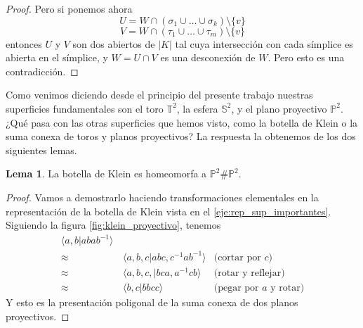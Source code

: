 \documentclass[10pt]{report}
\newcommand{\Esfera}{\mathbb{S}^2}
\newcommand{\Toro}{\mathbb{T}^2}
\newcommand{\Proyectivo}{\mathbb{P}^2}
\theoremstyle{definition}
\newtheorem{lema}[defin]{Lema}
\begin{document}
\begin{proof}
Pero si ponemos ahora $$U=W\cap (\sigma_1 \cup \dots \cup \sigma_k )\setminus \{ v \}$$
$$V=W\cap (\tau_1 \cup \dots \cup \tau_m )\setminus \{ v \}$$ entonces $U$ y $V$ son dos abiertos de $|K|$ tal cuya intersección con cada símplice es abierta en el símplice, y $W=U\cap V$ es una desconexión de $W$. Pero esto es una contradicción.
\end{proof}

Como venimos diciendo desde el principio del presente trabajo nuestras superficies fundamentales son el toro $\Toro$, la esfera $ \Esfera$, y el plano proyectivo  $\Proyectivo$. ¿Qué pasa con las otras superficies que hemos visto, como la botella de Klein o la suma conexa de toros y planos proyectivos? La respuesta la obtenemos de los dos siguientes lemas.

\begin{lema}
La botella de Klein es homeomorfa a $\Proyectivo \# \Proyectivo$.
\end{lema}
\begin{proof}
Vamos a demostrarlo haciendo transformaciones elementales en la representación de la botella de Klein vista en el \autoref{eje:rep_sup_importantes}. 
Siguiendo la figura \autoref{fig:klein_proyectivo}, tenemos
\begin{align*}
\langle a,b| abab^{-1}\rangle & & \\
\approx & \, \langle a,b,c|abc, c^{-1}ab^{-1}\rangle &\text{(cortar por } c\text{)}\\
\approx & \, \langle a,b,c,|bca,a^{-1}cb\rangle &\text{(rotar y reflejar)}\\
\approx & \, \langle b,c|bbcc\rangle &\text{(pegar por } a \text{ y rotar)}
\end{align*}
Y esto es la presentación poligonal de la suma conexa de dos planos proyectivos.
\end{proof}
\end{document}
